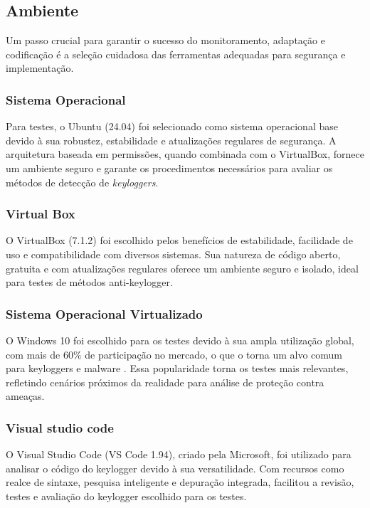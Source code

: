 \documentclass[12pt]{article}
\begin{document}
\subsection{Ambiente}
Um passo crucial para garantir o sucesso do monitoramento, adaptação e codificação é a seleção cuidadosa das ferramentas adequadas para segurança e implementação.

\subsubsection{Sistema Operacional}
Para testes, o Ubuntu (24.04) foi selecionado como sistema operacional base devido à sua robustez, estabilidade e atualizações regulares de segurança. A arquitetura baseada em permissões, quando combinada com o VirtualBox, fornece um ambiente seguro e garante os procedimentos necessários para avaliar os métodos de detecção de \textit{keyloggers}.

\subsubsection{Virtual Box}
O VirtualBox (7.1.2) foi escolhido pelos benefícios de estabilidade, facilidade de uso e compatibilidade com diversos sistemas. Sua natureza de código aberto, gratuita e com atualizações regulares oferece um ambiente seguro e isolado, ideal para testes de métodos anti-keylogger.
\subsubsection{Sistema Operacional Virtualizado}

O Windows 10 foi escolhido para os testes devido à sua ampla utilização global, com mais de 60\% de participação no mercado, o que o torna um alvo comum para keyloggers e malware \citep{tomshardware2023}. Essa popularidade torna os testes mais relevantes, refletindo cenários próximos da realidade para análise de proteção contra ameaças.

\subsubsection{Visual studio code}
O Visual Studio Code (VS Code 1.94), criado pela Microsoft, foi utilizado para analisar o código do keylogger devido à sua versatilidade. Com recursos como realce de sintaxe, pesquisa inteligente e depuração integrada, facilitou a revisão, testes e avaliação do keylogger escolhido para os testes.
\end{document}
